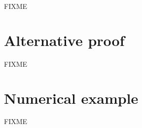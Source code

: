 \documentclass[a4paper]{article}
\begin{document}
FIXME

\section{Alternative proof}


FIXME

\section{Numerical example}


FIXME

\pagebreak
\printbibliography
\end{document}
